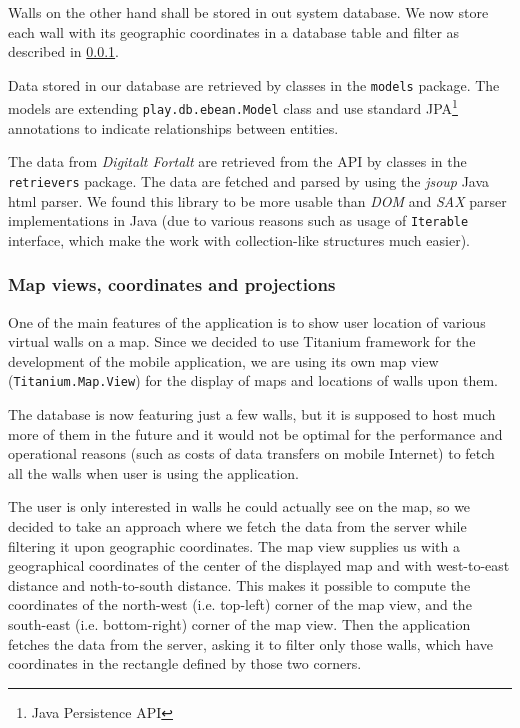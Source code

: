 \documentclass[11pt]{book}
\begin{document}
Walls on the other hand shall be stored in out system database. We now store each wall with its geographic coordinates in a database table and filter as described in \ref{sec:spr3_maps}. 

Data stored in our database are retrieved by classes in the \texttt{models} package. The models are extending \texttt{play.db.ebean.Model} class and use standard JPA\footnote{Java Persistence API} annotations to indicate relationships between entities.

The data from \emph{Digitalt Fortalt} are retrieved from the API by classes in the \texttt{retrievers} package. The data are fetched and parsed by using the \emph{jsoup} Java \gls{html} parser. We found this library to be more usable than \emph{DOM} and \emph{SAX} parser implementations in Java (due to various reasons such as usage of \texttt{Iterable} interface, which make the work with collection-like structures much easier).

\subsubsection{Map views, coordinates and projections} \label{sec:spr3_maps}

One of the main features of the application is to show user location of various virtual walls on a map. Since we decided to use Titanium framework for the development of the mobile application, we are using its own map view (\texttt{Titanium.Map.View}) for the display of maps and locations of walls upon them.

The database is now featuring just a few walls, but it is supposed to host much more of them in the future and it would not be optimal for the performance and operational reasons (such as costs of data transfers on mobile Internet) to fetch all the walls when user is using the application.

The user is only interested in walls he could actually see on the map, so we decided to take an approach where we fetch the data from the server while filtering it upon geographic coordinates. The map view supplies us with a geographical coordinates of the center of the displayed map and with west-to-east distance and noth-to-south distance. This makes it possible to compute the coordinates of the north-west (i.e. top-left) corner of the map view, and the south-east (i.e. bottom-right) corner of the map view. Then the application fetches the data from the server, asking it to filter only those walls, which have coordinates in the rectangle defined by those two corners.
\end{document}
